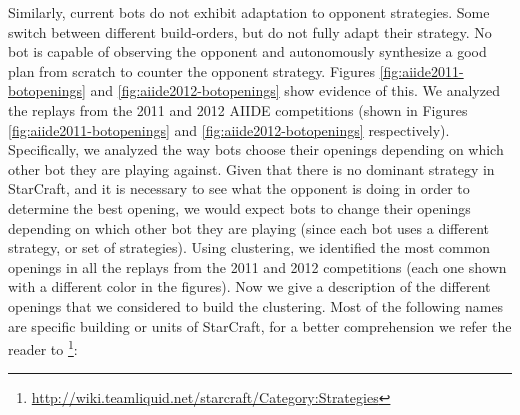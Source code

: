 \documentclass[journal]{IEEEtran}
\begin{document}
Similarly, current bots do not exhibit adaptation to opponent strategies. Some switch between different build-orders, but do not fully adapt their strategy. No bot is capable of observing the opponent and autonomously synthesize a good plan from scratch to counter the opponent strategy. Figures \ref{fig:aiide2011-botopenings} and \ref{fig:aiide2012-botopenings} show evidence of this. We analyzed the replays from the 2011 and 2012 AIIDE competitions (shown in Figures \ref{fig:aiide2011-botopenings} and \ref{fig:aiide2012-botopenings} respectively). Specifically, we analyzed the way bots choose their openings depending on which other bot they are playing against. Given that there is no dominant strategy in StarCraft, and it is necessary to see what the opponent is doing in order to determine the best opening, we would expect bots to change their openings depending on which other bot they are playing (since each bot uses a different strategy, or set of strategies). Using clustering, we identified the most common openings in all the replays from the 2011 and 2012 competitions (each one shown with a different color in the figures). Now we give a description of the different openings that we considered to build the clustering. Most of the following names are specific building or units of StarCraft, for a better comprehension we refer the reader to \footnote{\url{http://wiki.teamliquid.net/starcraft/Category:Strategies}}:
\end{document}
